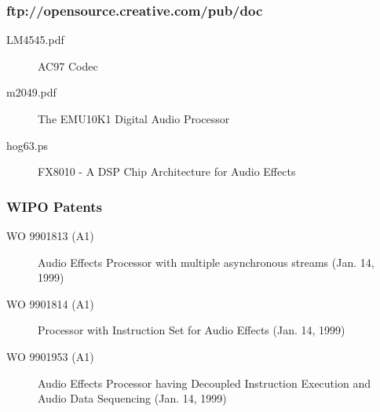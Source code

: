 \documentclass[a4paper,8pt,english]{sphinxmanual}
\begin{document}
\subsubsection{ftp://opensource.creative.com/pub/doc}
\label{sound/cards/sb-live-mixer:ftp-opensource-creative-com-pub-doc}\begin{description}
\item[{LM4545.pdf}] \leavevmode
AC97 Codec

\item[{m2049.pdf}] \leavevmode
The EMU10K1 Digital Audio Processor

\item[{hog63.ps}] \leavevmode
FX8010 - A DSP Chip Architecture for Audio Effects

\end{description}


\subsubsection{WIPO Patents}
\label{sound/cards/sb-live-mixer:wipo-patents}\begin{description}
\item[{WO 9901813 (A1)}] \leavevmode
Audio Effects Processor with multiple asynchronous streams
(Jan. 14, 1999)

\item[{WO 9901814 (A1)}] \leavevmode
Processor with Instruction Set for Audio Effects (Jan. 14, 1999)

\item[{WO 9901953 (A1)}] \leavevmode
Audio Effects Processor having Decoupled Instruction
Execution and Audio Data Sequencing (Jan. 14, 1999)

\end{description}
\end{document}
